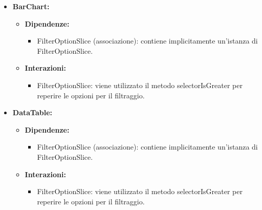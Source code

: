 \begin{itemize}
      \item \textbf{BarChart:}
            \begin{itemize}
                  \item \textbf{Dipendenze:}
                        \begin{itemize}
                              \item FilterOptionSlice (associazione): contiene implicitamente un'istanza di
                                    FilterOptionSlice.
                        \end{itemize}
                  \item \textbf{Interazioni:}
                        \begin{itemize}
                              \item FilterOptionSlice: viene utilizzato il metodo selectorIsGreater per reperire le
                                    opzioni per il filtraggio.
                        \end{itemize}
            \end{itemize}

      \item \textbf{DataTable:}
            \begin{itemize}
                  \item \textbf{Dipendenze:}
                        \begin{itemize}
                              \item FilterOptionSlice (associazione): contiene implicitamente un'istanza di
                                    FilterOptionSlice.
                        \end{itemize}
                  \item \textbf{Interazioni:}
                        \begin{itemize}
                              \item FilterOptionSlice: viene utilizzato il metodo selectorIsGreater per reperire le
                                    opzioni per il filtraggio.
                        \end{itemize}
            \end{itemize}


\end{itemize}
